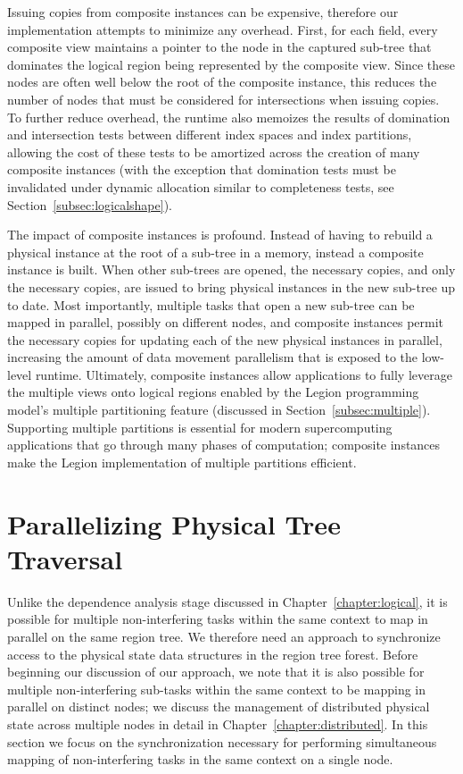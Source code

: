 Issuing copies from composite instances can be expensive,
therefore our implementation attempts to minimize any
overhead. First, for each field, every composite view 
maintains a pointer to the node in the captured sub-tree
that dominates the logical region being represented by
the composite view.  Since these nodes are often well below 
the root of the composite instance, this reduces the number
of nodes that must be considered for intersections
when issuing copies. To further reduce overhead, the runtime 
also memoizes the results of domination and intersection tests 
between different index spaces and index partitions, allowing
the cost of these tests to be amortized across the creation
of many composite instances (with the exception that domination
tests must be invalidated under dynamic allocation similar
to completeness tests, see Section~\ref{subsec:logicalshape}).

The impact of composite instances is profound. Instead of
having to rebuild a physical instance at the root of a
sub-tree in a memory, instead a composite instance is
built.  When other sub-trees are opened, the necessary
copies, and only the necessary copies, are issued to
bring physical instances in the new sub-tree up to
date.  Most importantly, multiple tasks that open
a new sub-tree can be mapped in parallel, possibly
on different nodes, and composite instances permit
the necessary copies for updating each of the new
physical instances in parallel, increasing the amount
of data movement parallelism that is exposed to the
low-level runtime. Ultimately, composite instances 
allow applications to fully leverage the multiple
views onto logical regions enabled by the Legion
programming model's multiple partitioning feature
(discussed in Section~\ref{subsec:multiple}).
Supporting multiple partitions is essential for
modern supercomputing applications that go through
many phases of computation; composite instances
make the Legion implementation of multiple
partitions efficient.


\section{Parallelizing Physical Tree Traversal}
\label{sec:paratraversal}
Unlike the dependence analysis stage discussed in 
Chapter~\ref{chapter:logical}, it is possible for 
multiple non-interfering tasks within the same context 
to map in parallel on the same region tree.
We therefore need an approach to synchronize access
to the physical state data structures in the 
region tree forest. Before beginning our discussion
of our approach, we note that it is also possible
for multiple non-interfering sub-tasks within the
same context to be mapping in parallel on distinct
nodes; we discuss the management of distributed 
physical state across multiple nodes in detail in
Chapter~\ref{chapter:distributed}. In this section we 
focus on the synchronization necessary for performing
simultaneous mapping of non-interfering tasks in
the same context on a single node.


